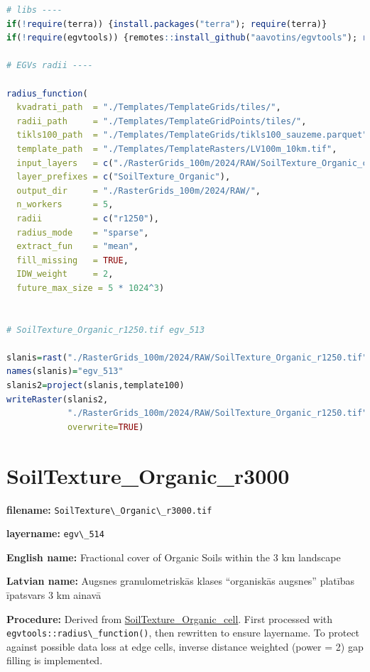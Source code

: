 \documentclass[
]{book}
\newcommand{\passthrough}[1]{#1}
\begin{document}
\begin{lstlisting}[language=R]
# libs ----
if(!require(terra)) {install.packages("terra"); require(terra)}
if(!require(egvtools)) {remotes::install_github("aavotins/egvtools"); require(egvtools)}

# EGVs radii ----

radius_function(
  kvadrati_path  = "./Templates/TemplateGrids/tiles/",
  radii_path     = "./Templates/TemplateGridPoints/tiles/",
  tikls100_path  = "./Templates/TemplateGrids/tikls100_sauzeme.parquet",
  template_path  = "./Templates/TemplateRasters/LV100m_10km.tif",
  input_layers   = c("./RasterGrids_100m/2024/RAW/SoilTexture_Organic_cell.tif"),
  layer_prefixes = c("SoilTexture_Organic"),
  output_dir     = "./RasterGrids_100m/2024/RAW/",
  n_workers      = 5,
  radii          = c("r1250"),
  radius_mode    = "sparse",
  extract_fun    = "mean",
  fill_missing   = TRUE,
  IDW_weight     = 2,
  future_max_size = 5 * 1024^3)


# SoilTexture_Organic_r1250.tif egv_513

slanis=rast("./RasterGrids_100m/2024/RAW/SoilTexture_Organic_r1250.tif")
names(slanis)="egv_513"
slanis2=project(slanis,template100)
writeRaster(slanis2,
            "./RasterGrids_100m/2024/RAW/SoilTexture_Organic_r1250.tif",
            overwrite=TRUE)
\end{lstlisting}

\section{SoilTexture\_Organic\_r3000}\label{ch06.514}

\textbf{filename:} \passthrough{\lstinline!SoilTexture\_Organic\_r3000.tif!}

\textbf{layername:} \passthrough{\lstinline!egv\_514!}

\textbf{English name:} Fractional cover of Organic Soils within the 3 km landscape

\textbf{Latvian name:} Augsnes granulometriskās klases ``organiskās augsnes'' platības īpatsvars 3 km ainavā

\textbf{Procedure:} Derived from \hyperref[ch06.511]{SoilTexture\_Organic\_cell}. First processed
with \passthrough{\lstinline!egvtools::radius\_function()!}, then rewritten to ensure layername. To protect against
possible data loss at edge cells, inverse distance weighted (power = 2) gap filling
is implemented.
\end{document}
